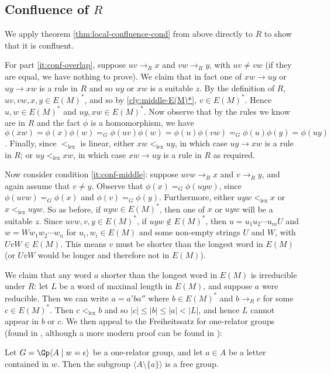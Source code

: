 \documentclass[11pt,libertine,widepage,nosubthm]{lmaths}
\newcommand{\ltlex}{<_{\mathrm{lex}}}
\begin{document}
\subsection{Confluence of $R$}

We apply theorem \ref{thm:local-confluence-cond} from above directly to $R$ to show that it is confluent.

For part \ref{it:conf-overlap}, suppose $uv \to_R x$ and $vw \to_R y$, with $uv \ne vw$ (if they are equal, we have nothing to prove). We claim that in fact one of $xw \to uy$ or $uy \to xw$ is a rule in $R$ and so $uy$ or $xw$ is a suitable $z$. By the definition of $R$, $uv, vw, x, y\in E(M)^*$, and so by \cref{cly:middle-E(M)*}, $v \in E(M)^*$. Hence $u, w \in E(M)^*$ and $uy, xw \in E(M)^*$. Now observe that by the rules we know are in $R$ and the fact $\phi$ is a homomorphism, we have $\phi(xw) = \phi(x)\phi(w) =_G \phi(uv)\phi(w) = \phi(u)\phi(vw) =_G \phi(u)\phi(y) = \phi(uy)$. Finally, since $\ltlex$ is linear, either $xw \ltlex uy$, in which case $uy \to xw$ is a rule in $R$; or $uy \ltlex xw$, in which case $xw \to uy$ is a rule in $R$ as required.

Now consider condition \ref{it:conf-middle}: suppose $uvw \to_R x$ and $v \to_R y$, and again assume that $v \ne y$. Observe that $\phi(x) =_G \phi(uyw)$, since $\phi(uvw) =_G \phi(x)$ and $\phi(v) =_G \phi(y)$. Furthermore, either $uyw \ltlex x$ or $x \ltlex uyw$. So as before, if $uyw \in E(M)^*$, then one of $x$ or $uyw$ will be a suitable $z$. Since $uvw, v, y \in E(M)^*$, if $uyw \not\in E(M)^*$, then $u = u_1u_2 \cdots u_m U$ and $w = W w_1 w_2 \cdots w_n$ for $u_i, w_i \in E(M)$ and some non-empty strings $U$ and $W$, with $UvW \in E(M)$. This means $v$ must be shorter than the longest word in $E(M)$ (or $UvW$ would be longer and therefore not in $E(M)$).

We claim that any word $a$ shorter than the longest word in $E(M)$ is irreducible under $R$: let $L$ be a word of maximal length in $E(M)$, and suppose $a$ were reducible. Then we can write $a = a'ba''$ where $b \in E(M)^*$ and $b \to_R c$ for some $c \in E(M)^*$. Then $c \ltlex b$ and so $|c| \le |b| \le |a| < |L|$, and hence $L$ cannot appear in $b$ or $c$. We then appeal to the Freiheitssatz for one-relator groups (found in \cite{Magnus2004}, although a more modern proof can be found in \cite{Lyndon2001}):

\begin{theorem}[Freiheitssatz]
	Let $G = \Gp \langle A \mid w = \epsilon \rangle$ be a one-relator group, and let $a \in A$ be a letter contained in $w$. Then the subgroup $\langle A \setminus \{a\} \rangle$ is a free group.
\end{theorem}
\end{document}
